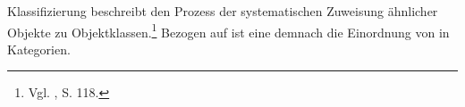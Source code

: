 Klassifizierung beschreibt den Prozess der systematischen Zuweisung ähnlicher Objekte zu Objektklassen.\footnote{Vgl. \cite{Elmasri.2009}, S. 118.}
Bezogen auf \EF ist eine \KA demnach die Einordnung von \EF in Kategorien.

